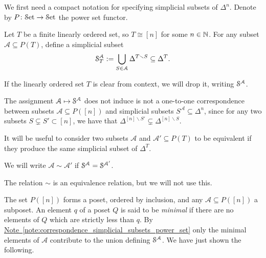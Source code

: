 \documentclass[main.tex]{subfiles}
\begin{document}
We first need a compact notation for specifying simplicial subsets of $\Delta^{n}$. Denote by $P\colon \Set \to \Set$ the power set functor.

\begin{definition}
  Let $T$ be a finite linearly ordered set, so $T \cong [n]$ for some $n \in \N$. For any subset $\mathcal{A} \subseteq  P(T)$, define a simplicial subset
  \begin{equation*}
    \S^{\mathcal{A}}_{T} := \bigcup_{S \in \mathcal{A}} \Delta^{T \smallsetminus S} \subseteq \Delta^{T}.
  \end{equation*}
\end{definition}

\begin{notation}
  If the linearly ordered set $T$ is clear from context, we will drop it, writing $\S^{\mathcal{A}}$.
\end{notation}

\begin{note}
  \label{note:correspondence_simplicial_subsets_power_set}
  The assignment $\mathcal{A} \mapsto \S^{\mathcal{A}}$ does not induce is not a one-to-one correspondence between subsets $\mathcal{A} \subseteq P([n])$ and simplicial subsets $S^{\mathcal{A}} \subseteq \Delta^{n}$, since for any two subsets $S \subsetneq S' \subset [n]$, we have that $\Delta^{[n] \smallsetminus S'} \subsetneq \Delta^{[n] \smallsetminus S}$.
\end{note}

It will be useful to consider two subsets $\mathcal{A}$ and $\mathcal{A}' \subseteq P(T)$ to be equivalent if they produce the same simplicial subset of $\Delta^{T}$.

\begin{definition}
  We will write $\mathcal{A} \sim \mathcal{A}'$ if $\S^{\mathcal{A}} = \S^{\mathcal{A}'}$.
\end{definition}

The relation $\sim$ is an equivalence relation, but we will not use this.

The set $P([n])$ forms a poset, ordered by inclusion, and any $\mathcal{A} \subseteq P([n])$ a subposet. An element $q$ of a poset $Q$ is said to be \emph{minimal} if there are no elements of $Q$ which are strictly less than $q$. By \hyperref[note:correspondence_simplicial_subsets_power_set]{Note~\ref*{note:correspondence_simplicial_subsets_power_set}} only the minimal elements of $\mathcal{A}$ contribute to the union defining $\S^{\mathcal{A}}$. We have just shown the following.
\end{document}
